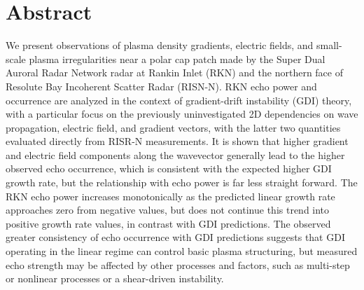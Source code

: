 \section*{Abstract}
We present observations of plasma density gradients, electric fields, and small-scale plasma irregularities near a polar cap patch made by the Super Dual Auroral Radar Network radar at Rankin Inlet (RKN) and the northern face of Resolute Bay Incoherent Scatter Radar (RISN-N). RKN echo power and occurrence are analyzed in the context of gradient-drift instability (GDI) theory, with a particular focus on the previously uninvestigated 2D dependencies on wave propagation, electric field, and gradient vectors, with the latter two quantities evaluated directly from RISR-N measurements. It is shown that higher gradient and electric field components along the wavevector generally lead to the higher observed echo occurrence, which is consistent with the expected higher GDI growth rate, but the relationship with echo power is far less straight forward. The RKN echo power increases monotonically as the predicted linear growth rate approaches zero from negative values, but does not continue this trend into positive growth rate values, in contrast with GDI predictions. The observed greater consistency of echo occurrence with GDI predictions suggests that GDI operating in the linear regime can control basic plasma structuring, but measured echo strength may be affected by other processes and factors, such as multi-step or nonlinear processes or a shear-driven instability.


%
%

% 


